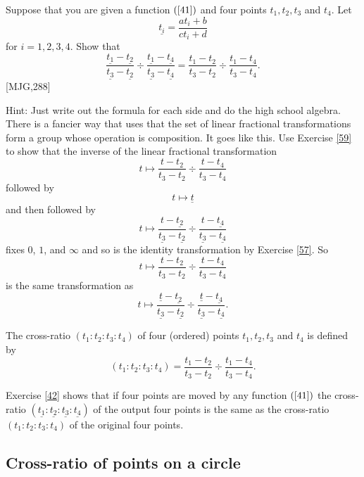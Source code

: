 \begin{exercise}
\label{42}Suppose that you are given a function $\left(  \ref{41}\right)  $
and four points $t_{1},t_{2},t_{3}$ and $t_{4}$. Let
\[
\underline{t_{i}}=\frac{at_{i}+b}{ct_{i}+d}%
\]
for $i=1,2,3,4$. Show that%
\[
\frac{\underline{t_{1}}-\underline{t_{2}}}{\underline{t_{3}}-\underline{t_{2}%
}}\div\frac{\underline{t_{1}}-\underline{t_{4}}}{\underline{t_{3}}%
-\underline{t_{4}}}=\frac{t_{1}-t_{2}}{t_{3}-t_{2}}\div\frac{t_{1}-t_{4}%
}{t_{3}-t_{4}}.
\]
[MJG,288]

Hint: Just write out the formula for each side and do the high school algebra.
There is a fancier way that uses that the set of linear fractional
transformations form a group whose operation is composition. It goes like
this. Use Exercise \ref{59} to show that the inverse of the linear fractional
transformation
\[
t\mapsto\frac{t-t_{2}}{t_{3}-t_{2}}\div\frac{t-t_{4}}{t_{3}-t_{4}}%
\]
followed by%
\[
t\mapsto\underline{t}%
\]
and then followed by
\[
t\mapsto\frac{t-\underline{t_{2}}}{\underline{t_{3}}-\underline{t_{2}}}%
\div\frac{t-\underline{t_{4}}}{\underline{t_{3}}-\underline{t_{4}}}%
\]
fixes $0$, $1$, and $\infty$ and so is the identity transformation by Exercise
\ref{57}. So%
\[
t\mapsto\frac{t-t_{2}}{t_{3}-t_{2}}\div\frac{t-t_{4}}{t_{3}-t_{4}}%
\]
is the same transformation as%
\[
t\mapsto\frac{\underline{t}-\underline{t_{2}}}{\underline{t_{3}}%
-\underline{t_{2}}}\div\frac{\underline{t}-\underline{t_{4}}}{\underline
{t_{3}}-\underline{t_{4}}}.
\]

\end{exercise}

\begin{definition}
\label{44}The cross-ratio $\left(  t_{1}:t_{2}:t_{3}:t_{4}\right)  $ of four
(ordered) points $t_{1},t_{2},t_{3}$ and $t_{4}$ is defined by%
\[
\left(  t_{1}:t_{2}:t_{3}:t_{4}\right)  =\frac{t_{1}-t_{2}}{t_{3}-t_{2}}%
\div\frac{t_{1}-t_{4}}{t_{3}-t_{4}}.
\]

\end{definition}

Exercise \ref{42} shows that if four points are moved by any function $\left(
\ref{41}\right)  $ the cross-ratio $\left(  \underline{t_{1}}:\underline
{t_{2}}:\underline{t_{3}}:\underline{t_{4}}\right)  $ of the output four
points is the same as the cross-ratio $\left(  t_{1}:t_{2}:t_{3}:t_{4}\right)
$ of the original four points.\pagebreak

\subsection{Cross-ratio of points on a circle}

